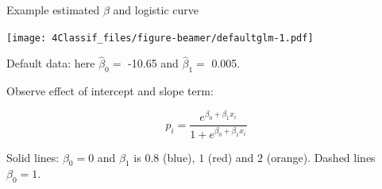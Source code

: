 \documentclass[10pt,ignorenonframetext,]{beamer}
\begin{document}
\begin{frame}

\begin{block}{Example estimated \(\beta\) and logistic curve}

\texttt{[image: 4Classif\_files/figure-beamer/defaultglm-1.pdf]}

Default data: here \(\hat{\beta}_0=\) -10.65 and \(\hat{\beta}_1=\)
0.005.

\end{block}

\end{frame}

\begin{frame}[fragile]

Observe effect of intercept and slope term:

\[p_i= \frac{e^{\beta_0+\beta_1 x_i}}{1 + e^{\beta_0 + \beta_1 x_i}}\]

Solid lines: \(\beta_0=0\) and \(\beta_1\) is \(0.8\) (blue), \(1\)
(red) and \(2\) (orange). Dashed lines \(\beta_0=1\).


\end{frame}
\end{document}
